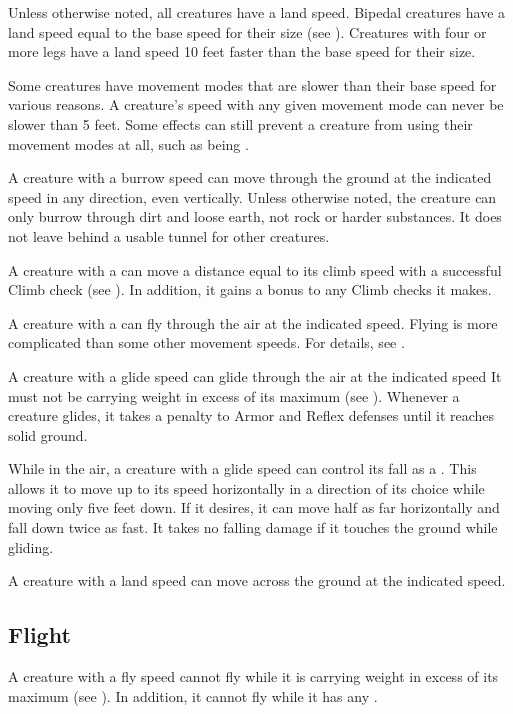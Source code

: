         Unless otherwise noted, all creatures have a land speed.
        Bipedal creatures have a land speed equal to the base speed for their size (see ).
        Creatures with four or more legs have a land speed 10 feet faster than the base speed for their size.

        Some creatures have movement modes that are slower than their base speed for various reasons.
        A creature's speed with any given movement mode can never be slower than 5 feet.
        Some effects can still prevent a creature from using their movement modes at all, such as being \immobilized.

        A creature with a burrow speed can move through the ground at the indicated speed in any direction, even vertically. Unless otherwise noted, the creature can only burrow through dirt and loose earth, not rock or harder substances. It does not leave behind a usable tunnel for other creatures.

        A creature with a  can move a distance equal to its climb speed with a successful Climb check (see ).
        In addition, it gains a  bonus to any Climb checks it makes.

        A creature with a  can fly through the air at the indicated speed.
        Flying is more complicated than some other movement speeds.
        For details, see .

        \label{Gliding}
        A creature with a glide speed can glide through the air at the indicated speed
        It must not be carrying weight in excess of its maximum  (see ).
        Whenever a creature glides, it takes a  penalty to Armor and Reflex defenses until it reaches solid ground.

        While in the air, a creature with a glide speed can control its fall as a . This allows it to move up to its speed horizontally in a direction of its choice while moving only five feet down. If it desires, it can move half as far horizontally and fall down twice as fast. It takes no falling damage if it touches the ground while gliding.

        A creature with a land speed can move across the ground at the indicated speed.

    \subsection{Flight}\label{Flight}
        A creature with a fly speed cannot fly while it is carrying weight in excess of its maximum  (see ).
        In addition, it cannot fly while it has any .

